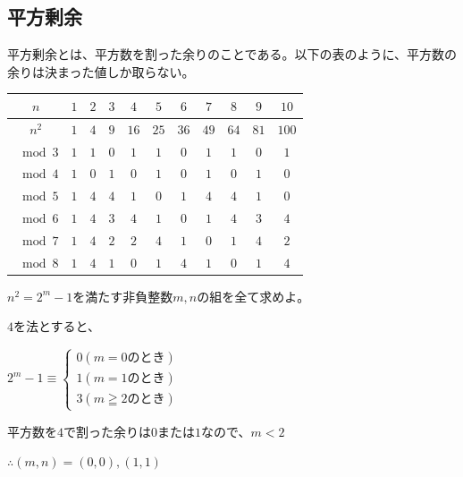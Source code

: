 \documentclass[uplatex,dvipdfmx]{jsbook}
\begin{document}
\subsection{平方剰余}
平方剰余とは、平方数を割った余りのことである。以下の表のように、平方数の余りは決まった値しか取らない。

\begin{table}[h]
    \begin{tabular}{|c||c|c|c|c|c|c|c|c|c|c|}
        \hline
        $n$ & $1$ & $2$ & $3$ & $4$ & $5$ & $6$ & $7$ & $8$ & $9$ & $10$\\\hline
        $n^2$ & $1$ & $4$ & $9$ & $16$ & $25$ & $36$ & $49$ & $64$ & $81$ & $100$\\\hline
        $\mod 3$ & $1$ & $1$ & $0$ & $1$ & $1$ & $0$ & $1$ & $1$ & $0$ & $1$\\\hline
        $\mod 4$ & $1$ & $0$ & $1$ & $0$ & $1$ & $0$ & $1$ & $0$ & $1$ & $0$\\\hline
        $\mod 5$ & $1$ & $4$ & $4$ & $1$ & $0$ & $1$ & $4$ & $4$ & $1$ & $0$\\\hline
        $\mod 6$ & $1$ & $4$ & $3$ & $4$ & $1$ & $0$ & $1$ & $4$ & $3$ & $4$\\\hline
        $\mod 7$ & $1$ & $4$ & $2$ & $2$ & $4$ & $1$ & $0$ & $1$ & $4$ & $2$\\\hline
        $\mod 8$ & $1$ & $4$ & $1$ & $0$ & $1$ & $4$ & $1$ & $0$ & $1$ & $4$\\\hline
    \end{tabular}
\end{table}

\begin{problem}[練習問題]
    $n^2=2^m-1$を満たす非負整数$m,n$の組を全て求めよ。
\end{problem}

\begin{answer}
    $4$を法とすると、

    $2^m-1\equiv
    \begin{cases}
        0\left(m=0\text{のとき}\right)\\
        1\left(m=1\text{のとき}\right)\\
        3\left(m\geqq 2\text{のとき}\right)
    \end{cases}$

    平方数を$4$で割った余りは$0$または$1$なので、$m<2$

    $\therefore\left(m,n\right)=\left(0,0\right),\left(1,1\right)$
\end{answer}
\end{document}
